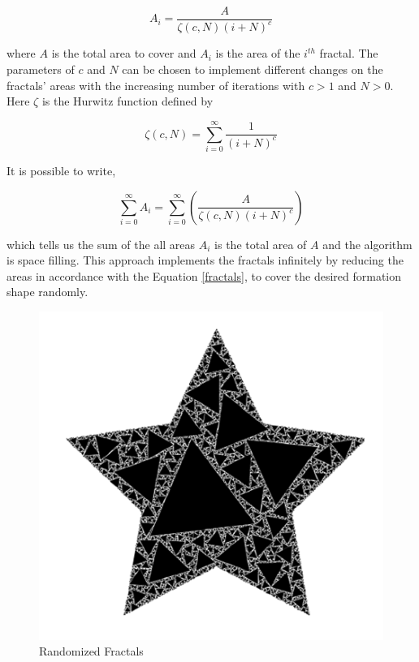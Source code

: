 \begin{equation} \label{fractals}
A_i = \frac{A}{\zeta(c,N)(i+N)^c}
\end{equation}

where $A$ is the total area to cover and $A_i$ is the area of the $i^{th}$ fractal. The parameters of $c$ and $N$ can be chosen to implement different changes on the fractals' areas with the increasing number of iterations with $c>1$ and $N>0$. Here  $\zeta$ is the Hurwitz function defined by

\begin{equation}
\zeta(c,N) = \sum_{i=0}^{\infty} \frac{1}{(i+N)^c}
\end{equation}

It is possible to write, 
	
\begin{equation}
\sum_{i=0}^{\infty}A_i = \sum_{i = 0}^{\infty}\left(\frac{A}{\zeta(c,N)(i+N)^c}\right)
\end{equation}
	
which tells us the sum of the all areas $A_i$ is the total area of $A$ and the algorithm is space filling. This approach implements the fractals infinitely by reducing the areas in accordance with the Equation \ref{fractals}, to cover the desired formation shape randomly. 

\begin{figure}[H]
\caption{Randomized Fractals \cite{26}}
\centering
\includegraphics[scale = 0.60]{randomized}
\end{figure}
	
